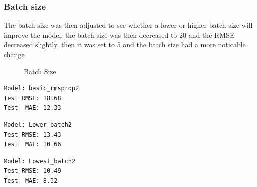 \documentclass[10pt,11pt,12pt,oneside]{book}
\begin{document}
\subsubsection{Batch size}
The batch size was then adjusted to see whether a lower or higher batch size will improve the model. the batch size was then decreased to 20 and the RMSE decreased slightly, then it was set to 5 and the batch size had a more noticable change\\
\begin{figure}[H]
    \centering
    \qquad
    \caption{Batch Size}%
    \label{fig:batch}%
\end{figure}
\begin{multicols}{3}
\centering
\begin{verbatim}
Model: basic_rmsprop2
Test RMSE: 18.68
Test  MAE: 12.33
\end{verbatim}
\begin{verbatim}
Model: Lower_batch2
Test RMSE: 13.43
Test  MAE: 10.66
\end{verbatim}
\begin{verbatim}
Model: Lowest_batch2
Test RMSE: 10.49
Test  MAE: 8.32
\end{verbatim}
\end{multicols}
\end{document}
